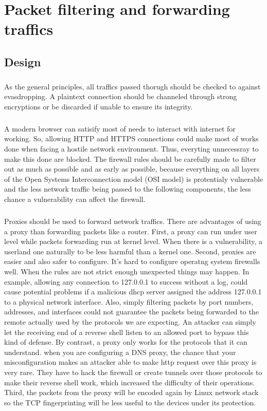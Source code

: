 \documentclass[mscthesis]{usiinfthesis}
\begin{document}
\chapter{Packet filtering and forwarding traffics}
\section{Design}
\paragraph{}
As the general principles, all traffics passed thorugh should be checked to against evasdropping. A plaintext connection should be channeled through strong encryptions or be discarded if unable to ensure its integrity.
\paragraph{}
A modern browser can satisify most of needs to interact with internet for working. So, allowing HTTP and HTTPS connections could make most of works done when facing a hostile network environment. Thus, everyting unnecessray to make this done are blocked. The firewall rules should be carefully made to filter out as much as possible and as early as possible, because everything on all layers of the Open Systems Interconnection model (OSI model) is protentialy vulnerable and the less network traffic being passed to the following components, the less chance a vulnerability can affect the firewall.
\paragraph{}
Proxies should be used to forward network traffics. There are advantages of using a proxy than forwarding packets like a router. First, a proxy can run under user level while packets forwarding run at kernel level. When there is a vulnerability, a userland one naturally to be less harmful than a kernel one. Second, proxies are easier and also safer to configure. It's hard to configure operatng system firewalls well. When the rules are not strict enough unexpected things may happen. In example, allowing any connection to 127.0.0.1 to success without a log, could cause potential problems if a malicious dhcp server assigned the address 127.0.0.1 to a physical network interface. Also, simply filtering packets by port numbers, addresses, and interfaces could not guarantee the packets being forwarded to the remote actually used by the protocols we are expecting. An attacker can simply let the receiving end of a reverse shell listen to an allowed port to bypass this kind of defense. By contrast, a proxy only works for the protocols that it can understand. when you are configuring a DNS proxy, the chance that your misconfiguration makes an attacker able to make http request over this proxy is very rare. They have to hack the firewall or create tunnels over those protocols to make their reverse shell work, which increased the difficulty of their operations. Third, the packets from the proxy will be encoded again by Linux network stack so the TCP fingerprinting will be less useful to the devices under its protection.
\end{document}
